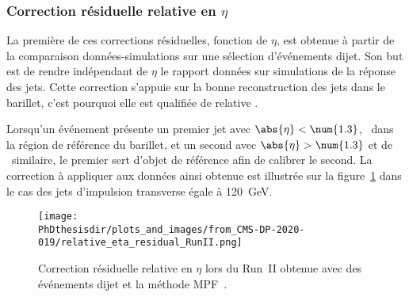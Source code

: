 \subsubsection{Correction résiduelle relative en $\eta$}\label{chapter-JERC-section-CMS-subsec-residuals_eta}
La première de ces corrections résiduelles, fonction de $\eta$, est obtenue à partir de la comparaison données-simulations sur une sélection d'événements dijet.
Son but est de rendre indépendant de $\eta$ le rapport données sur simulations de la réponse des jets.
Cette correction s'appuie sur la bonne reconstruction des jets dans le barillet, c'est pourquoi elle est qualifiée de \og relative \fg.
\par Lorsqu'un événement présente un premier jet avec $\abs{\eta}<\num{1.3}$, \ie\ dans la région de référence du barillet, et un second avec $\abs{\eta}>\num{1.3}$ et de \pT\ similaire, le premier sert d'objet de référence afin de calibrer le second.
La correction à appliquer aux données ainsi obtenue est illustrée sur la figure~\ref{fig-L2ResRel_RunII} dans le cas des jets d'impulsion transverse égale à \SI{120}{\GeV}.
\begin{figure}[h]
\centering
\texttt{[image: \\PhDthesisdir/plots\_and\_images/from\_CMS-DP-2020-019/relative\_eta\_residual\_RunII.png]}
\caption[Correction résiduelle relative en $\eta$ lors du Run~II.]{Correction résiduelle relative en $\eta$ lors du Run~II obtenue avec des événements dijet et la méthode MPF~\cite{CMS-DP-2020-019}.}
\label{fig-L2ResRel_RunII}
\end{figure}
